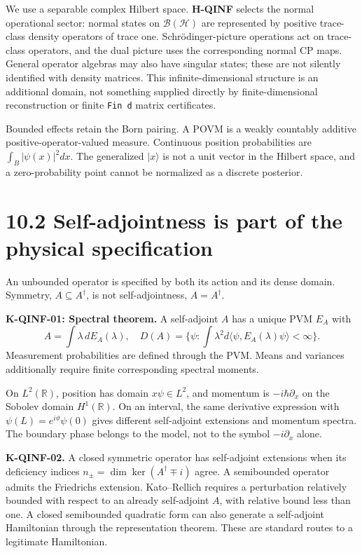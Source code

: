 \documentclass[
  11pt,
  oneside]{book}
\begin{document}
We use a separable complex Hilbert space. \textbf{H-QINF} selects the
normal operational sector: normal states on \(\mathcal B(\mathcal H)\)
are represented by positive trace-class density operators of trace one.
Schrödinger-picture operations act on trace-class operators, and the
dual picture uses the corresponding normal CP maps. General operator
algebras may also have singular states; these are not silently
identified with density matrices. This infinite-dimensional structure is
an additional domain, not something supplied directly by
finite-dimensional reconstruction or finite \texttt{Fin\ d} matrix
certificates.

Bounded effects retain the Born pairing. A POVM is a weakly countably
additive positive-operator-valued measure. Continuous position
probabilities are \(\int_B|\psi(x)|^2dx\). The generalized \(|x\rangle\)
is not a unit vector in the Hilbert space, and a zero-probability point
cannot be normalized as a discrete posterior.

\section{10.2 Self-adjointness is part of the physical specification}

An unbounded operator is specified by both its action and its dense
domain. Symmetry, \(A\subseteq A^\dagger\), is not self-adjointness,
\(A=A^\dagger\).

\textbf{K-QINF-01: Spectral theorem.} A self-adjoint \(A\) has a unique
PVM \(E_A\) with \[
A=\int\lambda\,dE_A(\lambda),\quad
D(A)=\{\psi:\int\lambda^2d\langle\psi,E_A(\lambda)\psi\rangle<\infty\}.
\] Measurement probabilities are defined through the PVM. Means and
variances additionally require finite corresponding spectral moments.

On \(L^2(\mathbb R)\), position has domain \(x\psi\in L^2\), and
momentum is \(-i\hbar\partial_x\) on the Sobolev domain
\(H^1(\mathbb R)\). On an interval, the same derivative expression with
\(\psi(L)=e^{i\vartheta}\psi(0)\) gives different self-adjoint
extensions and momentum spectra. The boundary phase belongs to the
model, not to the symbol \(-i\partial_x\) alone.

\textbf{K-QINF-02.} A closed symmetric operator has self-adjoint
extensions when its deficiency indices
\(n_\pm=\dim\ker(A^\dagger\mp i)\) agree. A semibounded operator admits
the Friedrichs extension. Kato--Rellich requires a perturbation
relatively bounded with respect to an already self-adjoint \(A\), with
relative bound less than one. A closed semibounded quadratic form can
also generate a self-adjoint Hamiltonian through the representation
theorem. These are standard routes to a legitimate Hamiltonian.
\end{document}
